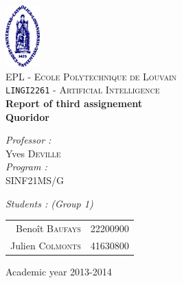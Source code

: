 \begin{titlepage}
 
\begin{center}
 
\vspace*{-2cm}\includegraphics[width=0.10\textwidth]{ucl.png}\\[1cm]
 
\textsc{\LARGE EPL - Ecole Polytechnique de Louvain}\\[1.5cm]
 
\textsc{\Large \texttt{LINGI2261} - Artificial Intelligence}\\[0.5cm]
 
 
\vspace{1.0cm}
{ \huge \bfseries Report of third assignement\\Quoridor\vspace{0.8cm}\\}
 
\vspace{1.0cm}
 
\begin{minipage}{0.4\textwidth}
\begin{flushleft} \large
\emph{Professor :}\\
	Yves \textsc{Deville}\\
\vspace{1cm}
\emph{Program :}\\
	SINF21MS/G
\end{flushleft}
\end{minipage}
\begin{minipage}{0.4\textwidth}
\begin{flushright} \large
\emph{Students : (Group 1)} \\
\begin{tabular}{rl}
	Benoît \textsc{Baufays}		& {\footnotesize 22200900}\\
	Julien \textsc{Colmonts}	& {\footnotesize 41630800}\\
\end{tabular}
\end{flushright}
\end{minipage}
 
\vfill
 
\vspace{1.1cm}
{\large Academic year 2013-2014}
\vspace{-1cm} 
\end{center}
 
\end{titlepage}

